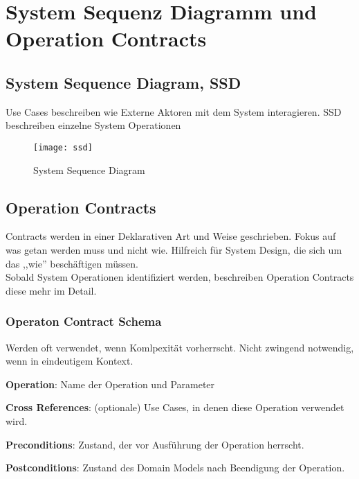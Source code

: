 \chapter{System Sequenz Diagramm und Operation Contracts}

\section{System Sequence Diagram, SSD}
Use Cases beschreiben wie Externe Aktoren mit dem System interagieren.
SSD beschreiben einzelne System Operationen

\begin{figure}[!h]
    \centering
    \texttt{[image: ssd]}
    \caption{System Sequence Diagram}
\end{figure}

\section{Operation Contracts}
Contracts werden in einer Deklarativen Art und Weise geschrieben. Fokus auf
was getan werden muss und nicht wie. Hilfreich für System Design, die sich um
das ,,wie'' beschäftigen müssen. \\
Sobald System Operationen identifiziert werden, beschreiben Operation Contracts
diese mehr im Detail.

\subsection{Operaton Contract Schema}
Werden oft verwendet, wenn Komlpexität vorherrscht. Nicht zwingend notwendig,
wenn in eindeutigem Kontext.
\begin{compactitem}
    \item \textbf{Operation}: Name der Operation und Parameter
    \item \textbf{Cross References}: (optionale) Use Cases, in denen diese Operation
    verwendet wird.
    \item \textbf{Preconditions}: Zustand, der vor Ausführung der Operation herrscht.
    \item \textbf{Postconditions}: Zustand des Domain Models nach Beendigung der
    Operation.
\end{compactitem}
